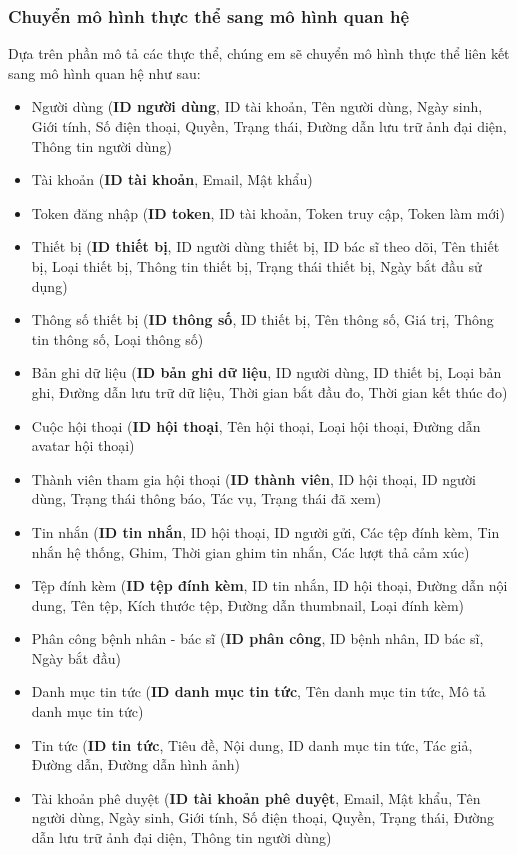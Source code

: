 \subsubsection{Chuyển mô hình thực thể sang mô hình quan hệ}
Dựa trên phần mô tả các thực thể, chúng em sẽ chuyển mô hình thực thể liên kết sang mô hình quan hệ như sau:

\begin{itemize}
  \item Người dùng (\textbf{ID người dùng}, ID tài khoản, Tên người dùng, Ngày sinh, Giới tính, Số điện thoại, Quyền, Trạng thái, Đường dẫn lưu trữ ảnh đại diện, Thông tin người dùng)
  \item Tài khoản (\textbf{ID tài khoản}, Email, Mật khẩu)
  \item Token đăng nhập (\textbf{ID token}, ID tài khoản, Token truy cập, Token làm mới)
  \item Thiết bị (\textbf{ID thiết bị}, ID người dùng thiết bị, ID bác sĩ theo dõi, Tên thiết bị, Loại thiết bị, Thông tin thiết bị, Trạng thái thiết bị, Ngày bắt đầu sử dụng)
  \item Thông số thiết bị (\textbf{ID thông số}, ID thiết bị, Tên thông số, Giá trị, Thông tin thông số, Loại thông số)
  \item Bản ghi dữ liệu (\textbf{ID bản ghi dữ liệu}, ID người dùng, ID thiết bị, Loại bản ghi, Đường dẫn lưu trữ dữ liệu, Thời gian bắt đầu đo, Thời gian kết thúc đo)
  \item Cuộc hội thoại (\textbf{ID hội thoại}, Tên hội thoại, Loại hội thoại, Đường dẫn avatar hội thoại)
  \item Thành viên tham gia hội thoại (\textbf{ID thành viên}, ID hội thoại, ID người dùng, Trạng thái thông báo, Tác vụ, Trạng thái đã xem)
  \item Tin nhắn (\textbf{ID tin nhắn}, ID hội thoại, ID người gửi, Các tệp đính kèm, Tin nhắn hệ thống, Ghim, Thời gian ghim tin nhắn, Các lượt thả cảm xúc)
  \item Tệp đính kèm (\textbf{ID tệp đính kèm}, ID tin nhắn, ID hội thoại, Đường dẫn nội dung, Tên tệp, Kích thước tệp, Đường dẫn thumbnail, Loại đính kèm)
  \item Phân công bệnh nhân - bác sĩ (\textbf{ID phân công}, ID bệnh nhân, ID bác sĩ, Ngày bắt đầu)
  \item Danh mục tin tức (\textbf{ID danh mục tin tức}, Tên danh mục tin tức, Mô tả danh mục tin tức)
  \item Tin tức (\textbf{ID tin tức}, Tiêu đề, Nội dung, ID danh mục tin tức, Tác giả, Đường dẫn, Đường dẫn hình ảnh)
  \item Tài khoản phê duyệt (\textbf{ID tài khoản phê duyệt}, Email, Mật khẩu, Tên người dùng, Ngày sinh, Giới tính, Số điện thoại, Quyền, Trạng thái, Đường dẫn lưu trữ ảnh đại diện, Thông tin người dùng)
\end{itemize}


